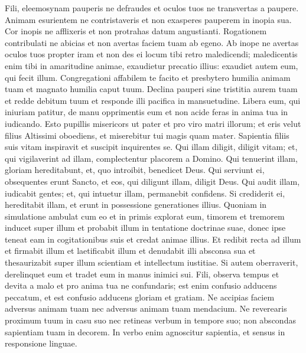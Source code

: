 \begin{biblechapter}
\begin{biblechapter}
\begin{biblechapter}
\begin{biblechapter}
\verse Fili, eleemosynam pauperis ne defraudes
 et oculos tuos ne transvertas a paupere.
 \verse Animam esurientem ne contristaveris
 et non exasperes pauperem in inopia sua.
 \verse Cor inopis ne afflixeris
 et non protrahas datum angustianti.
 \verse Rogationem contribulati ne abicias
 et non avertas faciem tuam ab egeno.
 \verse Ab inope ne avertas oculos tuos propter iram
 et non des ei locum tibi retro maledicendi;
 \verse maledicentis enim tibi in amaritudine animae,
 exaudietur precatio illius:
 exaudiet autem eum, qui fecit illum.
 \verse Congregationi affabilem te facito
 et presbytero humilia animam tuam
 et magnato humilia caput tuum.
 \verse Declina pauperi sine tristitia aurem tuam
 et redde debitum tuum
 et responde illi pacifica in mansuetudine.
 \verse Libera eum, qui iniuriam patitur, de manu opprimentis eum
 et non acide feras in anima tua in iudicando.
 \verse Esto pupillis misericors ut pater
 et pro viro matri illorum;
 \verse et eris velut filius Altissimi oboediens,
 et miserebitur tui magis quam mater.
 \verse Sapientia filiis suis vitam inspiravit
 et suscipit inquirentes se.
 \verse Qui illam diligit, diligit vitam;
 et, qui vigilaverint ad illam, complectentur placorem a Domino.
 \verse Qui tenuerint illam, gloriam hereditabunt,
 et, quo introibit, benedicet Deus.
 \verse Qui serviunt ei, obsequentes erunt Sancto,
 et eos, qui diligunt illam, diligit Deus.
 \verse Qui audit illam, iudicabit gentes;
 et, qui intuetur illam, permanebit confidens.
 \verse Si crediderit ei, hereditabit illam,
 et erunt in possessione generationes illius.
 \verse Quoniam in simulatione ambulat cum eo
 et in primis explorat eum,
 \verse timorem et tremorem inducet super illum
 et probabit illum in tentatione doctrinae suae,
 donec ipse teneat eam in cogitationibus suis
 et credat animae illius.
 \verse Et redibit recta ad illum et firmabit illum
 et laetificabit illum 
\verse et denudabit illi absconsa sua
 et thesaurizabit super illum scientiam et intellectum iustitiae.
 \verse Si autem oberraverit, derelinquet eum
 et tradet eum in manus inimici sui.
 \verse Fili, observa tempus et devita a malo
 \verse et pro anima tua ne confundaris;
 \verse est enim confusio adducens peccatum,
 et est confusio adducens gloriam et gratiam.
 \verse Ne accipias faciem adversus animam tuam
 nec adversus animam tuam mendacium.
 \verse Ne reverearis proximum tuum in casu suo
 \verse nec retineas verbum in tempore suo;
 non abscondas sapientiam tuam in decorem.
 \verse In verbo enim agnoscitur sapientia,
 et sensus in responsione linguae.

\end{biblechapter}
\end{biblechapter}
\end{biblechapter}
\end{biblechapter}

